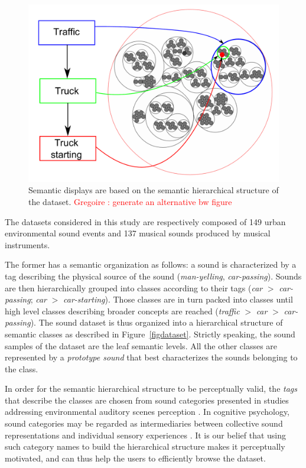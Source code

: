 \documentclass{aes2e}
\newcommand{\gl}[1]{\textcolor{red}{Gregoire : #1}}
\begin{document}
\begin{figure}[t]
\begin{center}
\includegraphics[scale=0.24]{gfx/SSF.pdf} 
\end{center}
\caption{\label{figSSF} Semantic displays are  based on the semantic hierarchical structure of the dataset. \gl{generate an alternative bw figure}}
\end{figure}


The datasets considered in this study are respectively composed of 149 urban environmental sound events and 137 musical sounds produced by musical instruments. 

The former has a semantic organization as follows: a sound is characterized by a tag describing the physical source of the sound (\textit{man-yelling}, \textit{car-passing}). Sounds are then hierarchically grouped into classes according to their tags (\textit{car} $>$ \textit{car-passing}; \textit{car} $>$ \textit{car-starting}). Those classes are in turn packed into classes until high level classes describing broader concepts are reached (\textit{traffic} $>$ \textit{car} $>$ \textit{car-passing}). The sound dataset is thus organized into a hierarchical structure of semantic classes as described in Figure~\ref{figdataset}. Strictly speaking, the sound samples of the dataset are the leaf semantic levels. All the other classes are represented by a \textit{prototype sound} that best characterizes the sounds belonging to the class. 

In order for the semantic hierarchical structure to be perceptually valid, the \textit{tags} that describe the classes  are chosen from sound categories presented in studies addressing environmental auditory scenes perception \cite{niessen2010categories, brown2011towards, dubois2006cognitive}. In cognitive psychology, sound categories may be regarded as intermediaries between collective sound representations and individual sensory experiences \cite{dubois2006cognitive}. It is our belief that using such category names to build the hierarchical structure makes it perceptually motivated, and can thus help the users to efficiently browse the dataset.
\end{document}
